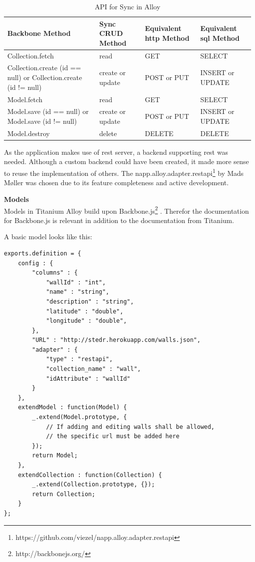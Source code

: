 \documentclass[11pt]{book}
\begin{document}
\begin{table}[H]
    \centering
    \begin{tabular}{| p{3.5cm} | p{3.5cm} | p{3.5cm} | p{2.5cm} |}
        \hline
        Backbone Method & Sync CRUD Method & Equivalent \gls{http} Method & Equivalent \gls{sql} Method\\
        \hline
        Collection.fetch & read & GET & SELECT\\
        \hline
        Collection.create (id == null) or Collection.create (id != null) & create or update & POST or PUT & INSERT or UPDATE\\
        \hline
        Model.fetch & read    & GET & SELECT\\
        \hline
        Model.save (id == null) or Model.save (id != null) & create or update & POST or PUT & INSERT or UPDATE\\
        \hline
        Model.destroy & delete & DELETE & DELETE\\
        \hline
    \end{tabular}
    \caption{API for Sync in Alloy\cite{titaniumAlloySync}}
    \label{tab:phase_sprint2_model}
\end{table}

As the application makes use of \gls{rest} server, a backend supporting \gls{rest} was needed. Although a custom backend could have been created, it made more sense to reuse the implementation of others. The napp.alloy.adapter.restapi\footnote{https://github.com/viezel/napp.alloy.adapter.restapi} by Mads Møller was chosen due to its feature completeness and active development.

\textbf{Models}\\
Models in Titanium Alloy build upon Backbone.js\footnote{http://backbonejs.org/} \cite{titaniumAlloyModel}. Therefor the documentation for Backbone.js is relevant in addition to the documentation from Titanium.

A basic model looks like this:
\begin{lstlisting}[frame=single]
exports.definition = {
    config : {
        "columns" : {
            "wallId" : "int",
            "name" : "string",
            "description" : "string",
            "latitude" : "double",
            "longitude" : "double",
        },
        "URL" : "http://stedr.herokuapp.com/walls.json",
        "adapter" : {
            "type" : "restapi",
            "collection_name" : "wall",
            "idAttribute" : "wallId"
        }
    },
    extendModel : function(Model) {
        _.extend(Model.prototype, {
            // If adding and editing walls shall be allowed,
            // the specific url must be added here
        });
        return Model;
    },
    extendCollection : function(Collection) {
        _.extend(Collection.prototype, {});
        return Collection;
    }
};
\end{lstlisting}
\end{document}
